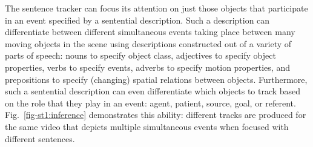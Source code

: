 The sentence tracker can focus its attention on just those objects that
participate in an event specified by a sentential description.
%
Such a description can differentiate between different simultaneous events
taking place between many moving objects in the scene using descriptions
constructed out of a variety of parts of speech: nouns to specify object class,
adjectives to specify object properties, verbs to specify events, adverbs to
specify motion properties, and prepositions to specify (changing) spatial
relations between objects.
%
Furthermore, such a sentential description can even differentiate which objects
to track based on the role that they play in an event: agent, patient, source,
goal, or referent.
%
Fig.~\ref{fig-st1:inference} demonstrates this ability: different tracks are
produced for the same video that depicts multiple simultaneous events when
focused with different sentences.


